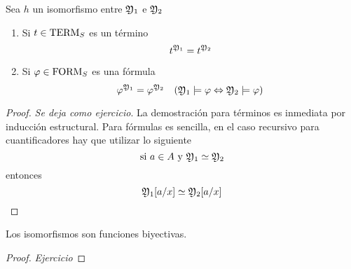 \begin{theorem}
Sea $h$ un isomorfismo entre $\mathfrak{Y}_1$ e $\mathfrak{Y}_2$
\begin{enumerate}
	\item Si $t \in \mbox{TERM}_{S}$ es un término
	\[ t^{\mathfrak{Y}_1}= t^{\mathfrak{Y}_2} \]
	\item Si $\varphi \in \mbox{FORM}_{S}$ es una fórmula
	\[ \varphi^{\mathfrak{Y}_1}= \varphi^{\mathfrak{Y}_2} \quad (\mathfrak{Y}_1 \models \varphi \Leftrightarrow \mathfrak{Y}_2 \models \varphi) \]
\end{enumerate}
\end{theorem}
\begin{proof}
\textit{Se deja como ejercicio}. La demostración para términos es inmediata por inducción estructural. Para fórmulas es sencilla, en el caso recursivo para cuantificadores hay que utilizar lo siguiente
\[ \mbox{si } a \in A \mbox{ y } \mathfrak{Y}_1 \simeq \mathfrak{Y}_2 \]
entonces
\[ \mathfrak{Y}_1[a/x] \simeq \mathfrak{Y}_2[a/x] \]   
\end{proof}
\begin{lemma} Los isomorfismos son funciones biyectivas.
\end{lemma}
\begin{proof}
\textit{Ejercicio}
\end{proof}
